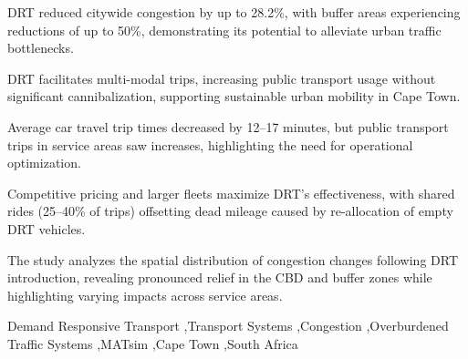 \documentclass[preprint,12pt,authoryear]{elsarticle}
\begin{document}
\begin{frontmatter}
\begin{abstract}
\end{abstract}


\begin{highlights}
\item DRT reduced citywide congestion by up to 28.2\%, with buffer areas experiencing reductions of up to 50\%, demonstrating its potential to alleviate urban traffic bottlenecks.
\item DRT facilitates multi-modal trips, increasing public transport usage without significant cannibalization, supporting sustainable urban mobility in Cape Town.
\item Average car travel trip times decreased by 12--17 minutes, but public transport trips in service areas saw increases, highlighting the need for operational optimization.
\item Competitive pricing and larger fleets maximize DRT’s effectiveness, with shared rides (25--40\% of trips) offsetting dead mileage caused by re-allocation of empty DRT vehicles.
\item The study analyzes the spatial distribution of congestion changes following DRT introduction, revealing pronounced relief in the CBD and buffer zones while highlighting varying impacts across service areas.
\end{highlights}

\begin{keyword}
Demand Responsive Transport \sep Transport Systems \sep Congestion \sep Overburdened Traffic Systems \sep MATsim \sep Cape Town \sep South Africa
\end{keyword}

\end{frontmatter}


\newpage












%
\end{document}

